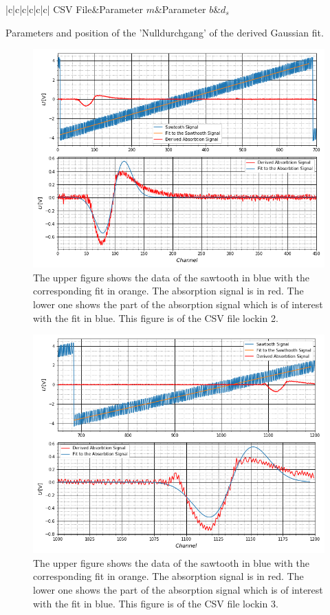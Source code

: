 	\begin{table}[ht]
		\begin{Dtabular}[1.1]{|c|c|c|c|c|c|}
			\hline
			CSV File&Parameter $m$&Parameter $b$&$d_s$\\
			\hline
		\end{Dtabular}
		\centering
		\caption[Parameter of Derived Gaussian]{Parameters and position of the 'Nulldurchgang' of the derived Gaussian fit.}
		\label{GaussianTable}
	\end{table}
	\begin{figure}[ht]
		\includegraphics[scale=0.5]{Bild/LockIn2.png}
		\centering
		\caption[Plots and Fits of Lock-In Method 2]{\small The upper figure shows the data of the sawtooth in blue with the corresponding fit in orange. The absorption signal is in red. The lower one shows the part of the absorption signal which is of interest with the fit in blue. This figure is of the CSV file lockin 2.}
		\label{Lock2}
	\end{figure}
	\begin{figure}[ht]
		\includegraphics[scale=0.5]{Bild/LockIn3.png}
		\centering
		\caption[Plots and Fits of Lock-In Method 3]{\small The upper figure shows the data of the sawtooth in blue with the corresponding fit in orange. The absorption signal is in red. The lower one shows the part of the absorption signal which is of interest with the fit in blue. This figure is of the CSV file lockin 3.}
		\label{Lock3}
	\end{figure}
